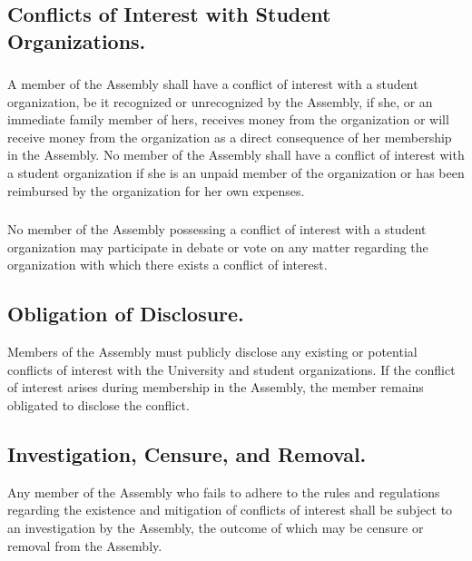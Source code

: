 \documentclass{rules}
\begin{document}
\subsection{Conflicts of Interest with Student Organizations.}
\subsubsection{}
A member of the Assembly shall have a conflict of interest with a student organization, be it recognized or unrecognized by the Assembly, if she, or an immediate family member of hers, receives money from the organization or will receive money from the organization as a direct consequence of her membership in the Assembly.  No member of the Assembly shall have a conflict of interest with a student organization if she is an unpaid member of the organization or has been reimbursed by the organization for her own expenses.
\subsubsection{}
No member of the Assembly possessing a conflict of interest with a student organization may participate in debate or vote on any matter regarding the organization with which there exists a conflict of interest.
\subsection{Obligation of Disclosure.}
Members of the Assembly must publicly disclose any existing or potential conflicts of interest with the University and student organizations.  If the conflict of interest arises during membership in the Assembly, the member remains obligated to disclose the conflict.
\subsection{Investigation, Censure, and Removal.}
Any member of the Assembly who fails to adhere to the rules and regulations regarding the existence and mitigation of conflicts of interest shall be subject to an investigation by the Assembly, the outcome of which may be censure or removal from the Assembly.
\end{document}
